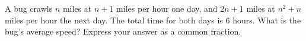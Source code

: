 A bug crawls $n$ miles at $n+1$ miles per hour one day, and $2n+1$ miles at $n^2+n$ miles per hour the next day. The total time for both days is $6$ hours. What is the bug's average speed? Express your answer as a common fraction.
